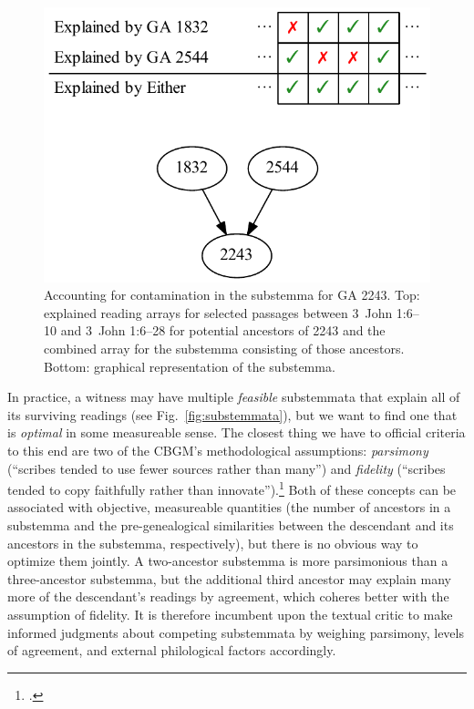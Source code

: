 \documentclass[a4paper, 12pt]{article}
\begin{document}
	\begin{figure}[h!]
		\centering
		\includegraphics[scale=0.6666]{../graphics/contamination.pdf}
		\caption{Accounting for contamination in the substemma for GA 2243. Top: explained reading arrays for selected passages between 3~John 1:6–10 and 3~John 1:6–28 for potential ancestors of 2243 and the combined array for the substemma consisting of those ancestors. Bottom: graphical representation of the substemma.}
		\label{fig:contamination}
	\end{figure}
	
	In practice, a witness may have multiple \emph{feasible} substemmata that explain all of its surviving readings (see Fig.~\ref{fig:substemmata}), but we want to find one that is \emph{optimal} in some measureable sense. The closest thing we have to official criteria to this end are two of the CBGM's methodological assumptions: \emph{parsimony} (``scribes tended to use fewer sources rather than many'') and \emph{fidelity} (``scribes tended to copy faithfully rather than innovate'').\footnote{\cite[98--99]{WG17}.} Both of these concepts can be associated with objective, measureable quantities (the number of ancestors in a substemma and the pre-genealogical similarities between the descendant and its ancestors in the substemma, respectively), but there is no obvious way to optimize them jointly. A two-ancestor substemma is more parsimonious than a three-ancestor substemma, but the additional third ancestor may explain many more of the descendant's readings by agreement, which coheres better with the assumption of fidelity. It is therefore incumbent upon the textual critic to make informed judgments about competing substemmata by weighing parsimony, levels of agreement, and external philological factors accordingly.
	
\end{document}
